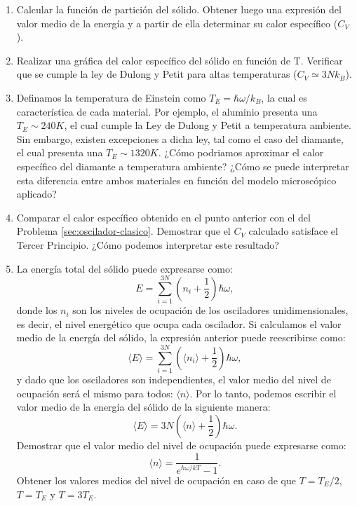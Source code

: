 \documentclass[a4paper,11pt]{article}
\begin{document}
\begin{enumerate}[label=(\alph*),
                  leftmargin=2\parindent,
                  rightmargin=2\parindent]

    \item{Calcular la función de partición del sólido.
          Obtener luego una expresión del valor medio de la energía y a
          partir de ella determinar su calor específico ($C_V$).}

    \item{Realizar una gráfica del calor específico del sólido en
          función de T.
          Verificar que se cumple la ley de Dulong y Petit para altas
          temperaturas ($C_V \simeq 3Nk_B$).}

    \item{Definamos la temperatura de Einstein como
          $T_E = \hbar \omega / k_B $, la cual es característica de
          cada material.
          Por ejemplo, el aluminio presenta una $T_E \sim 240 K$, el cual
          cumple la Ley de Dulong y Petit a temperatura ambiente.
          Sin embargo, existen excepciones a dicha ley, tal como el
          caso del diamante, el cual presenta una $T_E \sim 1320 K$.
          ¿Cómo podriamos aproximar el calor específico del diamante
          a temperatura ambiente?
          ¿Cómo se puede interpretar esta diferencia entre ambos
          materiales en función del modelo microscópico aplicado?
          }

    \item{Comparar el calor específico obtenido en el punto anterior
          con el del Problema \ref{sec:oscilador-clasico}. Demostrar
          que el $C_V$ calculado satisface el Tercer Principio. ¿Cómo
          podemos interpretar este resultado?}

    \item{La energía total del sólido puede expresarse como:
          $$ E =
          \sum_{i=1}^{3N} \left( n_i + \frac{1}{2} \right) \hbar \omega, $$
          donde los $n_i$ son los niveles de ocupación de los
          osciladores unidimensionales, es decir, el nivel energético
          que ocupa cada oscilador.
          Si calculamos el valor medio de la energía del sólido, la
          expresión anterior puede reescribirse como:
          $$ \langle E \rangle =
          \sum_{i=1}^{3N}
          \left( \langle n_i \rangle + \frac{1}{2} \right) \hbar \omega, $$
          y dado que los osciladores son independientes, el valor medio
          del nivel de ocupación será el mismo para todos:
          $\langle n \rangle$.
          Por lo tanto, podemos escribir el valor medio de la energía
          del sólido de la siguiente manera:
          $$ \langle E \rangle =
          3N \left( \langle n \rangle + \frac{1}{2} \right) \hbar \omega. $$
          Demostrar que el valor medio del nivel de ocupación puede
          expresarse como:
          $$ \langle n \rangle = \frac{1}{e^{\hbar \omega / kT} - 1}. $$
          Obtener los valores medios del nivel de ocupación en caso de
          que $ T = T_E/2$, $T= T_E$ y $T= 3T_E$.}

\end{enumerate}
\end{document}
